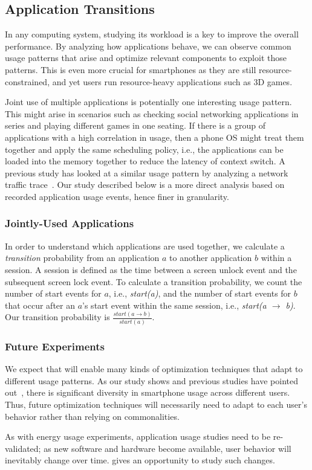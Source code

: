 \subsection{Application Transitions}
\label{subsec-apptransitions}



In any computing system, studying its workload is a key to improve the overall
performance. By analyzing how applications behave, we can observe common usage
patterns that arise and optimize relevant components to exploit those patterns.
This is even more crucial for smartphones as they are still
resource-constrained, and yet users run resource-heavy applications such as 3D
games.

Joint use of multiple applications is potentially one interesting usage pattern.
This might arise in scenarios such as checking social networking applications in
series and playing different games in one seating. If there is a group of
applications with a high correlation in usage, then a phone OS might treat them
together and apply the same scheduling policy, i.e., the applications can be
loaded into the memory together to reduce the latency of context switch.
A previous study has looked at a similar usage pattern by analyzing a network
traffic trace~\cite{xu:imc:2011}. Our study described below is a more direct
analysis based on recorded application usage events, hence finer in granularity.

\subsubsection{Jointly-Used Applications}
In order to understand which applications are used together, we calculate a {\it
transition} probability from an application $a$ to another application $b$
within a session. A session is defined as the time between a screen unlock event
and the subsequent screen lock event. To calculate a transition probability, we
count the number of start events for $a$, i.e., {\it start(a)}, and the number
of start events for $b$ that occur after an $a$'s start event within the same
session, i.e., {\it start(a $\rightarrow$ b)}. Our transition probability is
$\frac{start(a \rightarrow b)}{start(a)}$.

\subsubsection{Future Experiments}

We expect that \PhoneLab{} will enable many kinds of optimization techniques
that adapt to different usage patterns. As our study shows and previous studies
have pointed out~\cite{falaki:mobisys:2010, shye:micro:2009}, there is
significant diversity in smartphone usage across different users. Thus, future
optimization techniques will necessarily need to adapt to each user's behavior
rather than relying on commonalities.

As with energy usage experiments, application usage studies need to be
re-validated; as new software and hardware become available, user behavior will
inevitably change over time. \PhoneLab{} gives an opportunity to study such
changes.

